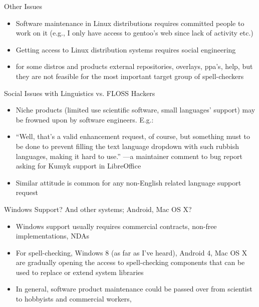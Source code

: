 \documentclass[t,12pt]{beamer}
\begin{document}
\begin{frame}{Other Issues}
    \begin{itemize}
        \item Software maintenance in Linux distributions requires committed
            people to work on it (e.g., I only have access to gentoo's web since
            lack of activity etc.)
        \item Getting access to Linux distribution systems requires social
            engineering
        \item for some distros and products external repositories, overlays,
            ppa's, help, but they are not feasible for the most important target
            group of spell-checkers
    \end{itemize}
\end{frame}

\begin{frame}{Social Issues with Linguistics vs. FLOSS Hackers}
    \begin{itemize}
        \item Niche products (limited use scientific software, small
            languages' support) may be frowned upon by software engineers. E.g.:
        \item ``Well, that's a valid enhancement request, of course, but
            something must to be done to prevent filling the text language
            dropdown with \alert{such rubbish languages}, making it hard to
            use.'' ---a maintainer comment to bug report asking for Kumyk
            support in LibreOffice
        \item Similar attitude is common for any non-English related language
            support request
    \end{itemize}
\end{frame}

\begin{frame}{Windows Support? And other systems; Android, Mac OS X?}
    \begin{itemize}
        \item Windows support usually requires commercial contracts, non-free
            implementations, NDAs
        \item For spell-checking, Windows 8 (as far as I've heard),
            Android 4, Mac OS X are gradually
            opening the access to spell-checking components that can be used
            to replace or extend system libraries
        \item In general, software product maintenance could be passed over
            from scientist to hobbyists and commercial workers, 
    \end{itemize}
\end{frame}
\end{document}
